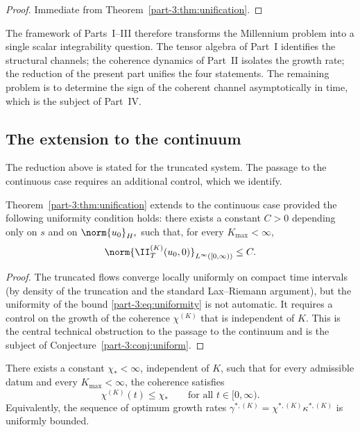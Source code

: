 \begin{proof}
Immediate from Theorem~\ref{part-3:thm:unification}.
\end{proof}

\begin{remark}[Framing]\label{part-3:rem:framing}
The framework of Parts~I--III therefore transforms the Millennium 
problem into a single scalar integrability question. The tensor 
algebra of Part~I identifies the structural channels; the coherence 
dynamics of Part~II isolates the growth rate; the reduction of the 
present part unifies the four statements. The remaining problem is to 
determine the sign of the coherent channel asymptotically in time, 
which is the subject of Part~IV.
\end{remark}

\subsection{The extension to the continuum}
\label{part-3:ssec:continuum}

The reduction above is stated for the truncated system. The passage 
to the continuous case requires an additional control, which we 
identify.

\begin{proposition}\label{part-3:prop:uniform}
Theorem~\ref{part-3:thm:unification} extends to the continuous case provided 
the following uniformity condition holds: there exists a constant 
$C>0$ depending only on $s$ and on $\norm{u_0}_{H^s}$ such that, for 
every $K_{\max}<\infty$,
\begin{equation}\label{part-3:eq:uniformity}
\norm{\II_T^{(K)}(u_0,0)}_{L^\infty([0,\infty))}\leq C.
\end{equation}
\end{proposition}

\begin{proof}
The truncated flows converge locally uniformly on compact time 
intervals (by density of the truncation and the standard 
Lax--Riemann argument), but the uniformity of the bound 
\eqref{part-3:eq:uniformity} is not automatic. It requires a control on the 
growth of the coherence $\chi^{(K)}$ that is independent of $K$. This 
is the central technical obstruction to the passage to the 
continuum and is the subject of Conjecture~\ref{part-3:conj:uniform}.
\end{proof}

\begin{conjecture}\label{part-3:conj:uniform}
There exists a constant $\chi_\ast<\infty$, independent of $K$, such 
that for every admissible datum and every $K_{\max}<\infty$, the 
coherence satisfies
\begin{equation}\label{part-3:eq:uniform-chi}
\chi^{(K)}(t)\leq \chi_\ast
\qquad\text{for all } t\in[0,\infty).
\end{equation}
Equivalently, the sequence of optimum growth rates 
$\gamma^{\ast,(K)} = \chi^{\ast,(K)}\kappa^{\ast,(K)}$ is uniformly 
bounded.
\end{conjecture}

